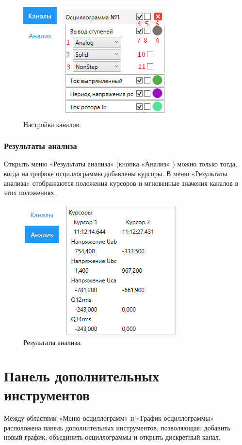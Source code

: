 \documentclass[a4paper,12pt]{article}
\begin{document}
 
\begin{figure}[h] 
\centering 
\includegraphics[width=40ex]{image/Channel.png} 
\caption{Настройка каналов.} 
\end{figure} 
 
 
\subsubsection*{\hspace{.5cm} Результаты анализа } 
\hspace{.5cm} Открыть меню «Результаты анализа» (кнопка «Анализ» ) можно только тогда, когда на графике осциллограммы добавлены курсоры.  
В меню «Результаты анализа» отображаются положения курсоров и мгновенные значения каналов в этих положениях. 
 
 
\begin{figure}[h] 
\centering 
\includegraphics[width=40ex]{image/Screenshot_8.png} 
\caption{Результаты анализа.} 
\end{figure} 
 
 
 
 
 
 
\section*{\hspace{.5cm} Панель дополнительных инструментов} 
\hspace{.5cm}Между областями «Меню осциллограмм» и «График осциллограммы» расположена панель дополнительных инструментов,  позволяющая: добавить новый график, объединить осциллограммы и открыть дискретный канал. 
 
\end{document}
